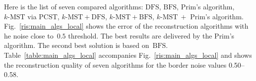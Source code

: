 \documentclass[12pt]{article}
\begin{document}
Here is the list of seven %
compared algorithms: %
$\text{DFS}$,
$\text{BFS}$,
Prim's algorithm,
$k\text{-MST}$ via $\text{PCST}$,
$k\text{-MST}+\text{DFS}$,
$k\text{-MST}+\text{BFS}$,
$k\text{-MST}~+$ Prim's algorithm. %
Fig.~\ref{ris:main_algs_local} shows the error of the reconstruction algorithms with he noise close to~$0.5$ threshold. The best results are delivered by the Prim's algorithm. The second best solution is based on~$\text{BFS}$. Table~\ref{table:main_algs_local} accompanies Fig.~\ref{ris:main_algs_local} and shows the reconstruction quality of seven algorithms for the border noise values 0.50--0.58.
%
%
\end{document}
